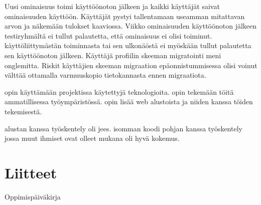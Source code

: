 \documentclass[11pt,a4paper,titlepage,oneside]{article}
\begin{document}
Uusi ominaisuus toimi käyttöönoton jälkeen ja kaikki käyttäjät saivat ominaisuuden käyttöön.
Käyttäjät pystyi tallentamaan useamman mitattavan arvon ja näkemään tulokset kaaviossa. %
Viikko ominaisuuden käyttöönoton jälkeen testiryhmältä ei tullut palautetta, että ominaisuus ei olisi toiminut.
%
käyttöliittymästän toiminnasta tai sen ulkonäöstä ei myöskään tullut palautetta sen käyttöönoton jälkeen.
%
Käyttäjä profiilin skeeman migratointi meni onglemitta.
Riskit käyttäjien skeeman migraation epäonnistummisessa olisi voinut välttää ottamalla varmuuskopio tietokannasta ennen migraatiota.
\medskip



opin käyttämään projektissa käytettyjä teknologioita.
opin tekemään töitä ammatillisessa työympäristössä.
opin lisää web alustoista ja niiden kanssa töiden tekemisestä.
\medskip


alustan kanssa työskentely oli jees.
isomman koodi pohjan kanssa työskentely jossa muut ihmiset ovat olleet mukana oli hyvä kokemus.
\medskip

\fi








\newpage











\section{Liitteet}               %

Oppimispäiväkirja




\end{document}
